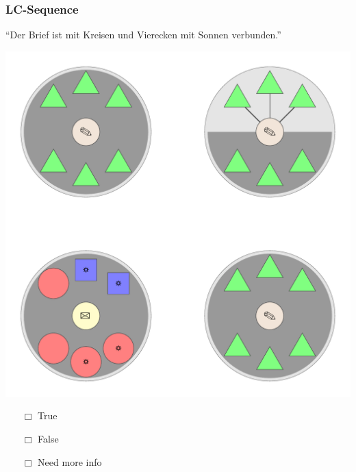 \documentclass[fleqn,10pt,xcolor=dvipsnames]{beamer}
\newcommand{\LC}{LC\xspace}
\newcommand{\mymark}[1]{{\color{mycol}{#1}}}
\begin{document}
\begin{frame}
  \frametitle{\LC-Sequence}
  \begin{center}
    ``Der Brief ist mit Kreisen und Vierecken mit Sonnen verbunden.''

    \vspace{0.1cm}

    \includegraphics[width=0.5 \textwidth]{../../pictures/lc_01_2.pdf}

    \vspace{0.1cm}

    \begin{multicols}{3}
      \begin{itemize} 
      \item[$\Box$] True\\
        \onslide<2>{$\leadsto$  \mymark{false}}
      \item[$\Box$] False\\
        \onslide<2>{$\leadsto$ \mymark{false}}
      \item[$\Box$] Need more info 
      \end{itemize}
    \end{multicols}

  \end{center}
\end{frame}
\end{document}
